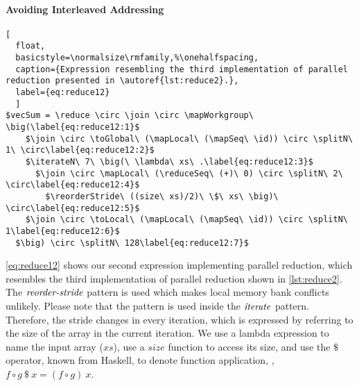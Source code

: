 \paragraph{Avoiding Interleaved Addressing}
\begin{lstlisting}[
  float,
  basicstyle=\normalsize\rmfamily,%\onehalfspacing,
  caption={Expression resembling the third implementation of parallel reduction presented in \autoref{lst:reduce2}.},
  label={eq:reduce12}
  ]
$vecSum = \reduce \circ \join \circ \mapWorkgroup\ \big(\label{eq:reduce12:1}$
    $\join \circ \toGlobal\ (\mapLocal\ (\mapSeq\ \id)) \circ \splitN\ 1\ \circ\label{eq:reduce12:2}$
    $\iterateN\ 7\ \big(\ \lambda\ xs\ .\label{eq:reduce12:3}$
      $\join \circ \mapLocal\ (\reduceSeq\ (+)\ 0) \circ \splitN\ 2\ \circ\label{eq:reduce12:4}$
        $\reorderStride\ ((size\ xs)/2)\ \$\ xs\ \big)\ \circ\label{eq:reduce12:5}$
    $\join \circ \toLocal\ (\mapLocal\ (\mapSeq\ \id)) \circ \splitN\ 1\label{eq:reduce12:6}$
  $\big) \circ \splitN\ 128\label{eq:reduce12:7}$
\end{lstlisting}
%
\autoref{eq:reduce12} shows our second expression implementing parallel reduction, which resembles the third implementation of parallel reduction shown in \autoref{lst:reduce2}.
The $\text{\textit{reorder-stride}}$ pattern is used which makes local memory bank conflicts unlikely.
Please note that the pattern is used inside the $\text{\textit{iterate}}$ pattern.
Therefore, the stride changes in every iteration, which is expressed by referring to the size of the array in the current iteration.
We use a lambda expression to name the input array ($xs$), use a $size$ function to access its size, and use the $\$$ operator, known from Haskell, to denote function application, \ie, $f \circ g\ \$\ x = (f\circ g)\ x$.


